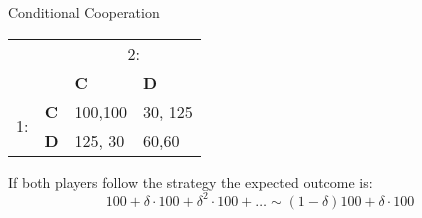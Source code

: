 \documentclass[english]{beamer}
\begin{document}
\begin{frame}{Conditional Cooperation}
    \begin{card}
        \begin{center}
            \begin{tabular}{cc|p{}|p{}|}
                 & \multicolumn{1}{c}{} & \multicolumn{2}{c}{2:}\\
                 & \multicolumn{1}{c}{} & \multicolumn{1}{p{0.14\textwidth}}{\textbf{C}} & \multicolumn{1}{p{0.14\textwidth}}{\textbf{D}}\\
                \cline{3-4}
                \multirow{2}{*}{1:} & \textbf{C} & 100,100 & 30, 125\\
                \cline{3-4}
                 & \textbf{D} & 125, 30 & 60,60\\
                \cline{3-4}
            \end{tabular}
        \end{center}
    \end{card}
    \begin{card}
    If both players follow the strategy the expected outcome is: $$100+\delta\cdot100+\delta^{2}\cdot100+\ldots\sim(1-\delta)100+\delta\cdot100$$
    \end{card}
\end{frame}
\end{document}
